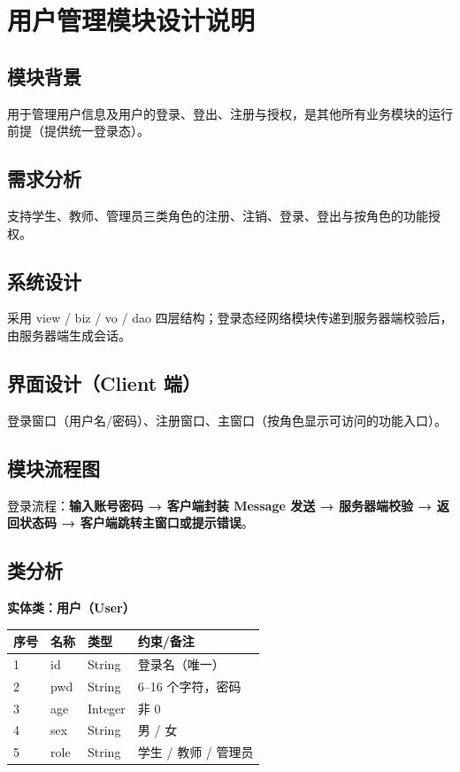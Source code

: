 \documentclass[12pt,a4paper]{ctexart}
\begin{document}
\section{用户管理模块设计说明}

\subsection{模块背景}
用于管理用户信息及用户的登录、登出、注册与授权，是其他所有业务模块的运行前提（提供统一登录态）。

\subsection{需求分析}
支持学生、教师、管理员三类角色的注册、注销、登录、登出与按角色的功能授权。

\subsection{系统设计}
采用 view / biz / vo / dao 四层结构；登录态经网络模块传递到服务器端校验后，由服务器端生成会话。

\subsection{界面设计（Client 端）}
登录窗口（用户名/密码）、注册窗口、主窗口（按角色显示可访问的功能入口）。

\subsection{模块流程图}
登录流程：\textbf{输入账号密码 → 客户端封装 Message 发送 → 服务器端校验 → 返回状态码 → 客户端跳转主窗口或提示错误}。

\subsection{类分析}
\textbf{实体类：用户（User）}
\begin{center}
\begin{tabular}{l l l l}
\toprule
序号 & 名称 & 类型 & 约束/备注 \\
\midrule
1 & id & String & 登录名（唯一） \\
2 & pwd & String & 6--16 个字符，密码 \\
3 & age & Integer & 非 0 \\
4 & sex & String & 男 / 女 \\
5 & role & String & 学生 / 教师 / 管理员 \\
\bottomrule
\end{tabular}
\end{center}
\end{document}
